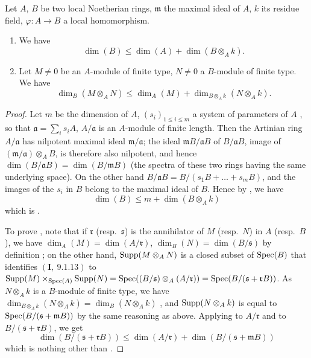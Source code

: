 \begin{proposition}[16.3.9]
\label{0.16.3.9}
Let $A$, $B$ be two local Noetherian rings, $\mathfrak{m}$ the maximal ideal of $A$, $k$ its residue field, $\varphi:A\to B$ a local homomorphism.
\begin{enumerate}
  \item[\rm{(i)}] We have
  \begin{equation}
  \label{0.16.3.9.1}
  \tag{16.3.9.1}
    \dim(B)\leq\dim(A)+\dim(B\otimes_Ak).
  \end{equation}
  \item[\rm{(ii)}] Let $M\neq 0$ be an $A$-module of finite type, $N\neq 0$ a $B$-module of finite type.
  We have
  \begin{equation}
  \label{0.16.3.9.2}
  \tag{16.3.9.2}
    \dim_B(M\otimes_AN)\leq\dim_A(M)+\dim_{B\otimes_Ak}(N\otimes_Ak).
  \end{equation}
\end{enumerate}
\end{proposition}

\begin{proof}
Let $m$ be the dimension of $A$, $(s_i)_{1\leq i\leq m}$ a system of parameters of $A$ , so that $\mathfrak{a}=\sum_i s_i A$, $A/\mathfrak{a}$ is an $A$-module of finite length.
Then the Artinian ring $A/\mathfrak{a}$ has nilpotent maximal ideal $\mathfrak{m}/\mathfrak{a}$; the ideal $\mathfrak{m}B/\mathfrak{a}B$ of $B/\mathfrak{a}B$, image of $(\mathfrak{m}/\mathfrak{a})\otimes_AB$, is therefore also nilpotent, and hence $\dim(B/\mathfrak{a}B)=\dim(B/\mathfrak{m}B)$ (the spectra of these two rings having the same underlying space).
On the other hand $B/\mathfrak{a}B=B/(s_1B+\ldots+s_m B)$, and the images of the $s_i$ in $B$ belong to the maximal ideal of $B$.
Hence by , we have
\[
  \dim(B)\leq m+\dim(B\otimes_Ak)
\]
which is .

To prove , note that if $\mathfrak{r}$ (resp.~$\mathfrak{s}$) is the annihilator of $M$ (resp.~$N$)  in $A$ (resp.~$B$), we have $\dim_A(M)=\dim(A/\mathfrak{r})$, $\dim_B(N)=\dim(B/\mathfrak{s})$ by definition ; on the other hand, $\operatorname{Supp}(M\otimes_AN)$ is a closed subset of $\operatorname{Spec}(B)$ that identifies $(\mathbf{I},~9.1.13)$ to $\operatorname{Supp}(M)\times_{\operatorname{Spec}(A)}\operatorname{Supp}(N)=\operatorname{Spec}((B/\mathfrak{s})\otimes_A(A/\mathfrak{r}))=\operatorname{Spec}(B/(\mathfrak{s}+\mathfrak{r}B))$.
As $N\otimes_Ak$ is a $B$-module of finite type, we have $\dim_{B\otimes_Ak}(N\otimes_Ak)=\dim_B(N\otimes_Ak)$ , and $\operatorname{Supp}(N\otimes_Ak)$ is equal to $\operatorname{Spec}(B/(\mathfrak{s}+\mathfrak{m}B))$ by the same reasoning as above.
Applying  to $A/\mathfrak{r}$ and to $B/(\mathfrak{s}+\mathfrak{r}B)$, we get
\[
  \dim(B/(\mathfrak{s}+\mathfrak{r}B))\leq\dim(A/\mathfrak{r})+\dim(B/(\mathfrak{s}+\mathfrak{m}B))
\]
which is nothing other than .
\end{proof}

